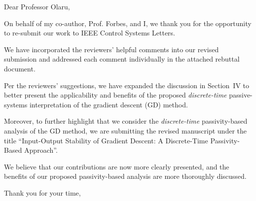 \thispagestyle{empty}
\setcounter{page}{0}
\begin{flushleft}
    Dear Professor Olaru,

    On behalf of my co-author, Prof. Forbes, and I, we thank you for the opportunity to re-submit our work to IEEE Control Systems Letters.

    We have incorporated the reviewers' helpful comments into our revised submission and addressed each comment individually in the attached rebuttal document. 
    
    Per the reviewers' suggestions, we have expanded the discussion in Section~IV to better present the applicability and benefits of the proposed \emph{discrete-time} passive-systems interpretation of the gradient descent (GD) method.

    Moreover, to further highlight that we consider the \emph{discrete-time} passivity-based analysis of the GD method, we are submitting the revised manuscript under the title ``Input-Output Stability of Gradient Descent: A Discrete-Time Passivity-Based Approach''.

    We believe that our contributions are now more clearly presented, and the benefits of our proposed passivity-based analysis are more thoroughly discussed.

    Thank you for your time,\\[1em]%
    \theauthor
\end{flushleft}
\newpage